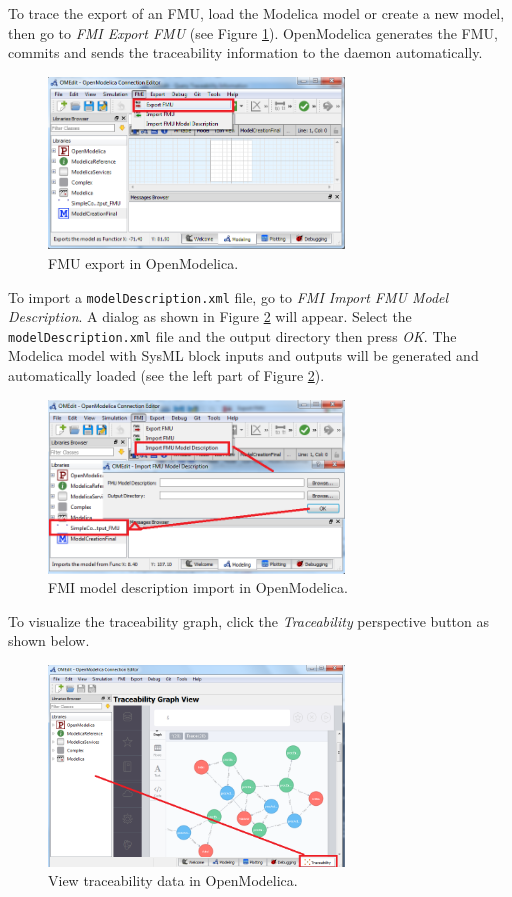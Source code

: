%
To trace the export of an FMU, load the Modelica model or create a new model, then go to \emph{FMI \textrightarrow{} Export FMU} (see Figure \ref{fig:OM_trace_config6}). OpenModelica generates the FMU, commits and sends the traceability information to the daemon automatically.
%
\begin{figure}[htbp]
\centering
\includegraphics[width=0.7\textwidth]{figures/OM_trace06}
\caption{FMU export in OpenModelica.}
\label{fig:OM_trace_config6}
\end{figure}

To import a \texttt{modelDescription.xml} file, go to \emph{FMI \textrightarrow{} Import FMU Model Description}. A dialog as shown in Figure \ref{fig:OM_trace_config7} will appear. Select the \texttt{modelDescription.xml} file and the output directory then press \emph{OK}. The Modelica model with SysML block inputs and outputs will be generated and automatically loaded (see the left part of Figure \ref{fig:OM_trace_config7}).
%
\begin{figure}[htbp]
\centering
\includegraphics[width=0.7\textwidth]{figures/OM_trace07}
\caption{FMI model description import in OpenModelica.}
\label{fig:OM_trace_config7}
\end{figure}
%
To visualize the traceability graph, click the \emph{Traceability} perspective button as shown below.
%
\begin{figure}[htbp]
\centering
\includegraphics[width=0.7\textwidth]{figures/OM_trace08}
\caption{View traceability data in OpenModelica.}
\label{fig:OM_trace_config8}
\end{figure}
%
%
%
%
